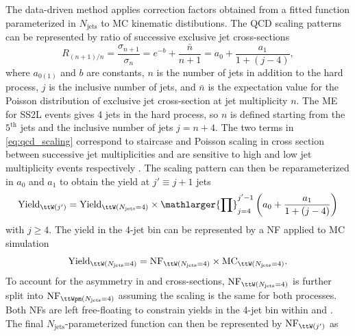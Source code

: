 \documentclass[../thesis.tex]{subfiles}
\begin{document}
The data-driven method applies correction factors obtained from a fitted function parameterized in $N_\mathrm{jets}$ to \ttW \acs{MC} kinematic distibutions. The \acs{QCD} scaling patterns \citep{bg:qcd_scaling} can be represented by ratio of successive exclusive jet cross-sections
\begin{equation}
\label{eq:qcd_scaling}
R_{(n+1)/n} = \frac{\sigma_{n+1}}{\sigma_n} = e^{-b} + \frac{\bar{n}}{n+1} = a_0 + \frac{a_1}{1+(j-4)},
\end{equation}
where $a_{0(1)}$ and $b$ are constants, $n$ is the number of jets in addition to the hard process, $j$ is the inclusive number of jets, and $\bar{n}$ is the expectation value for the Poisson distribution of exclusive jet cross-section at jet multiplicity $n$. The \ttW \acs{ME} for \acs{SS2L} events gives 4 jets in the hard process, so $n$ is defined starting from the $5^\text{th}$ jets and the inclusive number of jets $j=n+4$.
The two terms in \autoref{eq:qcd_scaling} correspond to staircase and Poisson scaling in cross section between successive jet multiplicities and are sensitive to high and low jet multiplicity events respectively \citep{bg:qcd_scaling}.
The scaling pattern can then be reparameterized in $a_0$ and $a_1$ to obtain the \ttW yield at $j'\equiv j+1$ jets
\begin{equation}
\mathrm{Yield}_{\ttW(j')} = \mathrm{Yield}_{\ttW(N_\mathrm{jets}=4)} \times 
\mathlarger{\prod}_{j=4}^{j'-1} \left( a_0 + \frac{a_1}{1+(j-4)} \right)
\end{equation}
with $j\geq 4$. The \ttW yield in the 4-jet bin can be represented by a \acs{NF} applied to \ttW \acs{MC} simulation 
\begin{equation}
\mathrm{Yield}_{\ttW(N_\mathrm{jets}=4)}=\mathrm{NF}_{\ttW(N_\mathrm{jets}=4)} \times \mathrm{MC}_{\ttW(N_\mathrm{jets}=4)}.
\end{equation}
To account for the asymmetry in \ttWplus and \ttWminus cross-sections, $\mathrm{NF}_{\ttW(N_\mathrm{jets}=4)}$ is further split into $\mathrm{NF}_{\ttWpm(N_\mathrm{jets}=4)}$ assuming the scaling is the same for both processes. Both \acs{NF}s are left free-floating to constrain \ttW yields in the 4-jet bin within \CRonebp and \CRonebm. The final $N_\mathrm{jets}$-parameterized function can then be represented by $\mathrm{NF}_{\ttW(j')}$ as
\end{document}
